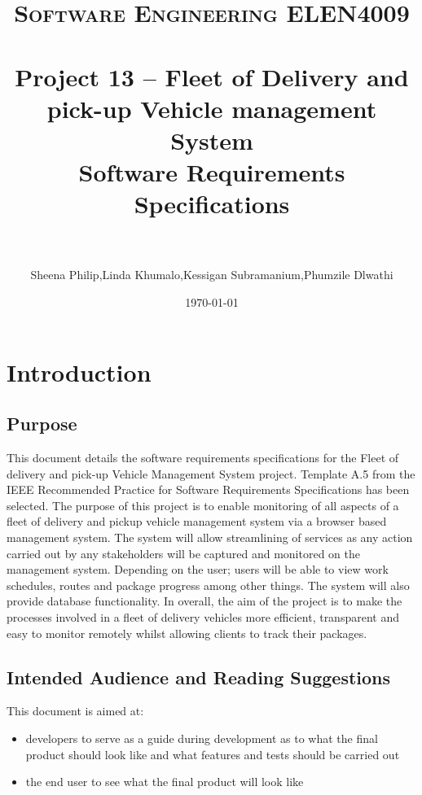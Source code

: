 \documentclass[paper=a4, fontsize=11pt]{scrartcl} %
\title{	
\normalfont \normalsize 
\textsc{Software Engineering ELEN4009} \\ [25pt] %
\horrule{0.5pt} \\[0.4cm] %
\huge Project 13 -- Fleet of Delivery and pick-up Vehicle management System \\ %
\huge Software Requirements Specifications \\ %
\horrule{2pt} \\[0.5cm] %
}
\author{Sheena Philip,Linda Khumalo,Kessigan Subramanium,Phumzile Dlwathi} %
\date{\normalsize\today} %
\numberwithin{equation}{section} %
\numberwithin{figure}{section} %
\numberwithin{table}{section} %
\begin{document}
\maketitle %


\section{Introduction}

\subsection{Purpose}

This document details the software requirements specifications for the Fleet of delivery and pick-up Vehicle Management System project. Template A.5 from the IEEE Recommended Practice for Software Requirements Specifications has been selected. 
The purpose of this project is to enable monitoring of all aspects of a fleet of delivery and pickup vehicle management system via a browser based management system. The system will allow streamlining of services as any action carried out by any stakeholders will be captured and monitored on the management system. Depending on the user; users will be able to view work schedules, routes and package progress among other things. The system will also provide database functionality. 
In overall, the aim of the project is to make the processes involved in a fleet of delivery vehicles more efficient, transparent and easy to monitor remotely whilst allowing clients to track their packages. 

\subsection{Intended Audience and Reading Suggestions}
This document is aimed at:

\begin{itemize}
	\item developers to serve as a guide during development as to what the final product should look like and what features and tests should be carried out

		\item the end user to see what the final product will look like
	
	 
\end{itemize}
\end{document}
